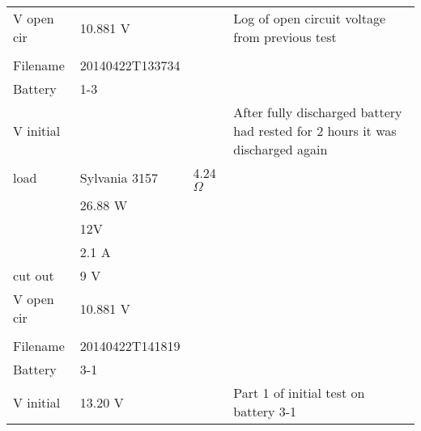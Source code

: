 \begin{table}[h]
\begin{tabular}{lllp{2.5cm}}
V open cir & 10.881 V                       &          & Log  of open circuit voltage from previous test                               \\
           &                                &          &                                                                               \\
Filename   & 20140422T133734                &          &                                                                               \\
Battery    & 1-3                            &          &                                                                               \\
V initial  &                                &          & After fully discharged battery had rested for 2 hours it was discharged again \\
load       & Sylvania 3157                  & 4.24 $\Omega$   &                                                                               \\
           & 26.88 W                        &          &                                                                               \\
           & 12V                            &          &                                                                               \\
           & 2.1 A                          &          &                                                                               \\
cut out    & 9 V                            &          &                                                                               \\
V open cir & 10.881 V                       &          &                                                                               \\
           &                                &          &                                                                               \\
\hline
Filename   & 20140422T141819                &          &                                                                               \\
Battery    & 3-1                            &          &                                                                               \\
V initial  & 13.20 V                        &          & Part 1 of initial test on battery 3-1                                         \\

\end{tabular}
\end{table}
